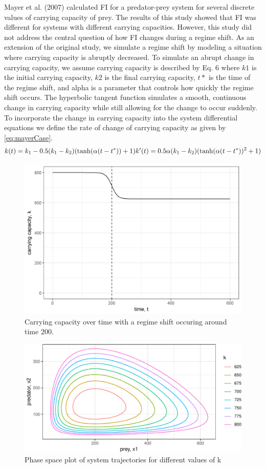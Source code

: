 \documentclass[12pt,twoside,openany]{reedthesis}
\begin{document}
Mayer et al. (2007) calculated FI for a predator-prey system for several
discrete values of carrying capacity of prey. The results of this study
showed that FI was different for systems with different carrying
capacities. However, this study did not address the central question of
how FI changes during a regime shift. As an extension of the original
study, we simulate a regime shift by modeling a situation where carrying
capacity is abruptly decreased. To simulate an abrupt change in carrying
capacity, we assume carrying capacity is described by Eq. 6 where \(k1\)
is the initial carrying capacity, \(k2\) is the final carrying capacity,
\(t*\) is the time of the regime shift, and alpha is a parameter that
controls how quickly the regime shift occurs. The hyperbolic tangent
function simulates a smooth, continuous change in carrying capacity
while still allowing for the change to occur suddenly. To incorporate
the change in carrying capacity into the system differential equations
we define the rate of change of carrying capacity as given by
\eqref{eq:mayerCase}.\\
\begin{equation}  
  k(t) = k_1  - 0.5(k_1-k_2)(\tanh(\alpha (t-t^*))+1)     \\
  k'(t) = 0.5\alpha (k_1-k_2)(\tanh(\alpha(t-t^*))^2 +1)      \\ 
\label{eq:mayerCase}
\end{equation}
\begin{figure}
\includegraphics[width=0.85\linewidth]{./chapterFiles/fiGuide/figures/kByTime} \caption{Carrying capacity over time with a regime shift occuring around time 200.}\label{fig:kByTime}
\end{figure}\begin{figure}
\includegraphics[width=0.85\linewidth]{_myDissertation_files/figure-latex/kTrajectories-1} \caption{Phase space plot of system trajectories for different values of k}\label{fig:kTrajectories}
\end{figure}
\end{document}

